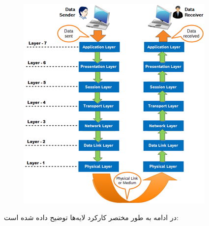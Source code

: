 \documentclass[]{article}
\begin{document}
\begin{figure}[H]
    \centerline{\includegraphics[scale=0.8]{resources/Layers.png}}
\end{figure}

در ادامه به طور مختصر کارکرد لایه‌ها توضیح داده شده است:
\end{document}
